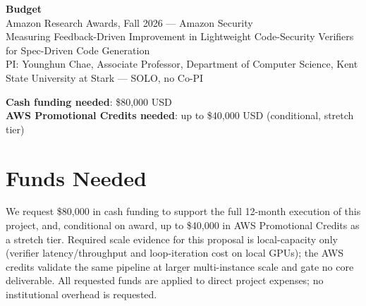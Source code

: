 \documentclass[11pt]{article}
\begin{document}
\begin{center}
{\Large\bfseries Budget}\\[2pt]
{\large Amazon Research Awards, Fall 2026 --- Amazon Security}\\[2pt]
{\large Measuring Feedback-Driven Improvement in Lightweight Code-Security Verifiers for Spec-Driven Code Generation}\\[2pt]
PI: Younghun Chae, Associate Professor, Department of Computer Science, Kent State University at Stark --- SOLO, no Co-PI
\end{center}

\bigskip
\noindent\textbf{Cash funding needed}: \$80,000 USD \\
\textbf{AWS Promotional Credits needed}: up to \$40,000 USD (conditional, stretch tier)

\bigskip
\section*{Funds Needed}
We request \$80,000 in cash funding to support the full 12-month execution of this project, and, conditional on award, up to \$40,000 in AWS Promotional Credits as a stretch tier. Required scale evidence for this proposal is local-capacity only (verifier latency/throughput and loop-iteration cost on local GPUs); the AWS credits validate the same pipeline at larger multi-instance scale and gate no core deliverable. All requested funds are applied to direct project expenses; no institutional overhead is requested.
\end{document}
